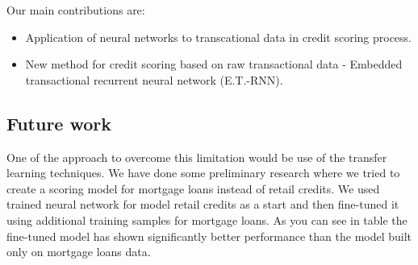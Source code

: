 \documentclass[sigconf]{acmart}
\begin{document}
Our main contributions are:
\begin{itemize}
\item{Application of neural networks to transcational data in credit scoring process.}
\item{New method for credit scoring based on raw transactional data - Embedded transactional recurrent neural network (E.T.-RNN).}
\end{itemize}

\subsection{Future work}

One of the approach to overcome this limitation would be use of the transfer learning techniques. We have done some preliminary research where we tried to create a scoring model for mortgage loans instead of retail credits. We used trained neural network for model retail credits as a start and then fine-tuned it using additional training samples for mortgage loans. As you can see in table the fine-tuned model has shown significantly better performance than the model built only on mortgage loans data.



\end{document}
